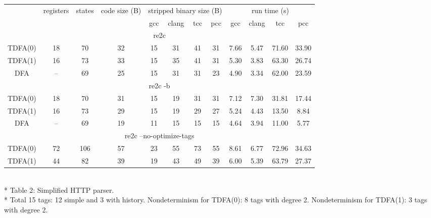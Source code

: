 \documentclass{article}
\theoremstyle{definition}
\begin{document}
\begin{center}
    \bigskip
    \begin{tabular}{|c|ccccccccccc|}
    \hline
    & registers & states & code size (B) & \multicolumn{4}{c}{stripped binary size (B)} & \multicolumn{4}{c|}{run time (s)} \\
    & & &
        & gcc & clang & tcc & pcc
        & gcc & clang & tcc & pcc \\
    \hline \hline
    \multicolumn{12}{|c|}{re2c} \\
    \hline
    TDFA(0) & 18 & 70 & 32 & 15 & 31 & 41 & 31 & 7.66 & 5.47 & 71.60 & 33.90 \\
    TDFA(1) & 16 & 73 & 33 & 15 & 35 & 41 & 31 & 5.30 & 3.83 & 63.30 & 26.74 \\
    DFA     & -- & 69 & 25 & 15 & 31 & 31 & 23 & 4.90 & 3.34 & 62.00 & 23.59 \\
    \hline \hline
    \multicolumn{12}{|c|}{re2c -b} \\
    \hline
    TDFA(0) & 18 & 70 & 31 & 15 & 19 & 31 & 31 & 7.12 & 7.30 & 31.81 & 17.44 \\
    TDFA(1) & 16 & 73 & 29 & 15 & 19 & 29 & 27 & 5.24 & 4.43 & 13.50 &  8.84 \\
    DFA     & -- & 69 & 19 & 11 & 15 & 15 & 15 & 4.64 & 3.94 & 11.00 &  5.77 \\
    \hline \hline
    \multicolumn{12}{|c|}{re2c --no-optimize-tags} \\
    \hline
    TDFA(0) & 72 & 106 & 57 & 23 & 55 & 73 & 55 & 8.61 & 6.77 & 72.96 & 34.63 \\
    TDFA(1) & 44 &  82 & 39 & 19 & 43 & 49 & 39 & 6.00 & 5.39 & 63.79 & 27.37 \\
    \hline
    \end{tabular}\\*
    \medskip
    Table 2: Simplified HTTP parser.\\*
    \medskip
    \small{Total 15 tags: 12 simple and 3 with history.
    Nondeterminism for TDFA(0): 8 tags with degree 2.
    Nondeterminism for TDFA(1): 3 tags with degree 2.}
    \bigskip
\end{center}
\end{document}

